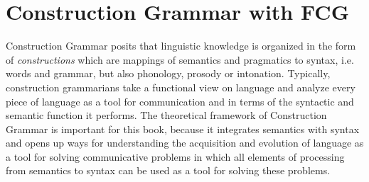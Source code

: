 %

\chapter{Construction Grammar with FCG}
\label{s:fcg}
Construction Grammar posits that  linguistic
knowledge is organized in the form of \emph{constructions}  \citep{goldberg1995constructions,croft2001radical}
which are mappings of semantics and pragmatics to syntax, 
i.e. words and grammar, but also phonology, prosody or intonation. 
Typically, construction grammarians take a functional view on language
and analyze every piece of language as a tool for communication and 
in terms of the syntactic and semantic function it performs.
The theoretical framework of Construction Grammar
is important for this book, because it integrates 
semantics with syntax and opens up 
ways for understanding the acquisition and evolution
of language as a tool for solving communicative problems 
in which all elements of processing from semantics to
syntax can be used as a tool for solving these
problems. 

